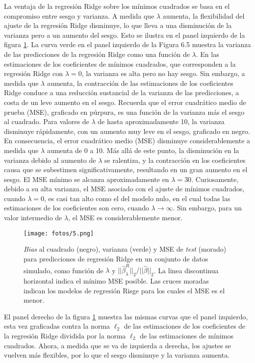 La ventaja de la regresión Ridge sobre los mínimos cuadrados se basa en el compromiso entre sesgo y varianza. A medida que $\lambda$ aumenta, la flexibilidad del ajuste de la regresión Ridge disminuye, lo que lleva a una disminución de la varianza pero a un aumento del sesgo. Esto se ilustra en el panel izquierdo de la figura \ref{fig:5}. La curva verde en el panel izquierdo de la Figura 6.5 muestra la varianza de las predicciones de la regresión Ridge como una función de $\lambda$. En las estimaciones de los coeficientes de mínimos cuadrados, que corresponden a la regresión Ridge con $\lambda = 0$, la varianza es alta pero no hay sesgo. Sin embargo, a medida que $\lambda$ aumenta, la contracción de las estimaciones de los coeficientes Ridge conduce a una reducción sustancial de la varianza de las predicciones, a costa de un leve aumento en el sesgo. Recuerda que el error cuadrático medio de prueba (MSE), graficado en púrpura, es una función de la varianza más el sesgo al cuadrado. Para valores de $\lambda$ de hasta aproximadamente 10, la varianza disminuye rápidamente, con un aumento muy leve en el sesgo, graficado en negro. En consecuencia, el error cuadrático medio (MSE) disminuye considerablemente a medida que $\lambda$ aumenta de 0 a 10. Más allá de este punto, la disminución en la varianza debido al aumento de $\lambda$ se ralentiza, y la contracción en los coeficientes causa que se subestimen significativamente, resultando en un gran aumento en el sesgo. El MSE mínimo se alcanza aproximadamente en $\lambda = 30$. Curiosamente, debido a su alta varianza, el MSE asociado con el ajuste de mínimos cuadrados, cuando $\lambda = 0$, es casi tan alto como el del modelo nulo, en el cual todas las estimaciones de los coeficientes son cero, cuando $\lambda \to \infty$. Sin embargo, para un valor intermedio de $\lambda$, el MSE es considerablemente menor.


\begin{figure}[h]
\centering
\texttt{[image: fotos/5.png]}
\caption{\textit{Bias} al cuadrado (negro), varianza (verde) y MSE de \textit{test} (morado) para predicciones de regresión Ridge en un conjunto de datos simulado, como función de $\lambda$ y $||\hat{\beta}_\lambda^R||_2/ ||\hat{\beta}||_2$. La linea discontinua horizontal indica el mínimo MSE posible. Las cruces moradas indican los modelos de regresión Risge para los cuales el MSE es el menor.}
\label{fig:5}
\end{figure}

El panel derecho de la figura \ref{fig:5} muestra las mismas curvas que el panel izquierdo, esta vez graficadas contra la norma $\ell_2$ de las estimaciones de los coeficientes de la regresión Ridge dividida por la norma $\ell_2$ de las estimaciones de mínimos cuadrados. Ahora, a medida que se va de izquierda a derecha, los ajustes se vuelven más flexibles, por lo que el sesgo disminuye y la varianza aumenta. \\

